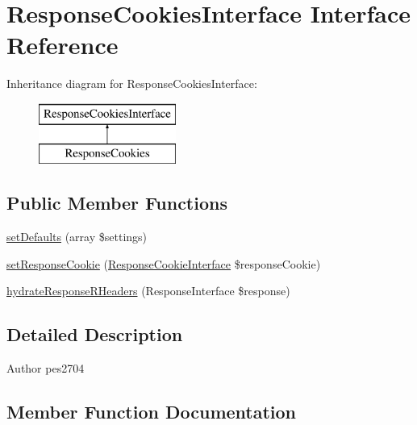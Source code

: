 \hypertarget{interface_pes_1_1_http_1_1_cookies_1_1_response_cookies_interface}{}\section{Response\+Cookies\+Interface Interface Reference}
\label{interface_pes_1_1_http_1_1_cookies_1_1_response_cookies_interface}
Inheritance diagram for Response\+Cookies\+Interface\+:\begin{figure}[H]
\begin{center}
\leavevmode
\includegraphics[height=2.000000cm]{interface_pes_1_1_http_1_1_cookies_1_1_response_cookies_interface}
\end{center}
\end{figure}
\subsection*{Public Member Functions}
\begin{DoxyCompactItemize}
\item 
\mbox{\hyperlink{interface_pes_1_1_http_1_1_cookies_1_1_response_cookies_interface_a462328426f473092af4994841a3bb3de}{set\+Defaults}} (array \$settings)
\item 
\mbox{\hyperlink{interface_pes_1_1_http_1_1_cookies_1_1_response_cookies_interface_a89be510b0aef08eb7545bf1215f39202}{set\+Response\+Cookie}} (\mbox{\hyperlink{interface_pes_1_1_http_1_1_cookies_1_1_response_cookie_interface}{Response\+Cookie\+Interface}} \$response\+Cookie)
\item 
\mbox{\hyperlink{interface_pes_1_1_http_1_1_cookies_1_1_response_cookies_interface_a7e113803ed4166b2bab9f6f68ca75921}{hydrate\+Response\+R\+Headers}} (Response\+Interface \$response)
\end{DoxyCompactItemize}


\subsection{Detailed Description}
\begin{DoxyAuthor}{Author}
pes2704 
\end{DoxyAuthor}


\subsection{Member Function Documentation}
\mbox{\label{interface_pes_1_1_http_1_1_cookies_1_1_response_cookies_interface_a7e113803ed4166b2bab9f6f68ca75921}} 
